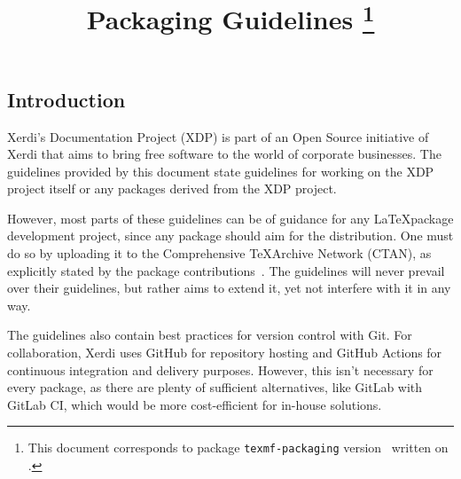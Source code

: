 \documentclass{xdpdoc}
\title{Packaging Guidelines%
\thanks{This document corresponds to package \texttt{texmf-packaging} version \gitversion\ written on \gitdate.}%
}
\begin{document}
    \maketitle

    \begin{multicols}{2}

        \section*{Introduction}
        Xerdi's Documentation Project (XDP)
        is part of an Open Source initiative of Xerdi that aims to bring free software to the world of corporate businesses.
        The guidelines provided by this document state guidelines for working on the XDP project itself or any packages
        derived from the XDP project.

        However, most parts of these guidelines can be of guidance for any \LaTeX package development project,
        since any package should aim for the \TeXLive distribution.
        One must do so by uploading it to the Comprehensive \TeX Archive Network (CTAN),
        as explicitly stated by the \TeXLive package contributions~\cite{texlive-packaging}.
        The guidelines will never prevail over their guidelines, but rather aims to extend it,
        yet not interfere with it in any way.

        The guidelines also contain best practices for version control with Git.
        For collaboration,
        Xerdi uses GitHub for repository hosting and GitHub Actions for continuous integration and delivery purposes.
        However, this isn't necessary for every package,
        as there are plenty of sufficient alternatives, like GitLab with GitLab CI,
        which would be more cost-efficient for in-house solutions.


\end{multicols}
\end{document}
